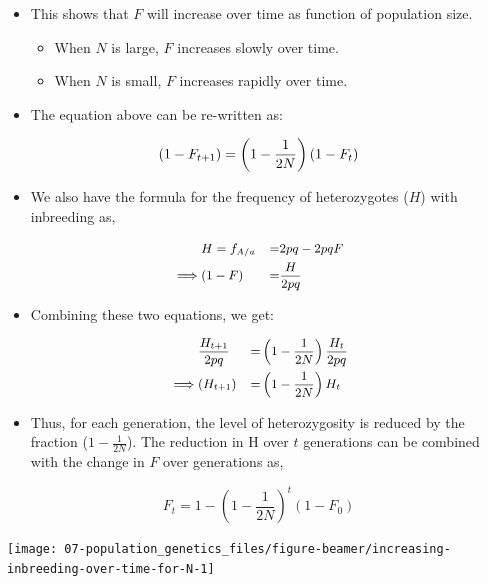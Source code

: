 \documentclass[11pt,dvipsnames,ignorenonframetext,aspectratio=169]{beamer}
\providecommand{\tightlist}{%
  \setlength{\itemsep}{0pt}\setlength{\parskip}{0pt}}
\begin{document}
\begin{frame}{}
\protect\hypertarget{section-8}{}
\footnotesize

\begin{itemize}
\tightlist
\item
  This shows that \(F\) will increase over time as function of
  population size.

  \begin{itemize}
  \tightlist
  \item
    When \(N\) is large, \(F\) increases slowly over time.
  \item
    When \(N\) is small, \(F\) increases rapidly over time.
  \end{itemize}
\item
  The equation above can be re-written as:
\end{itemize}

\[
\small
(1 - F_{t+1}) = \left(1 - \frac{1}{2N} \right) (1 - F_t)
\]
\end{frame}

\begin{frame}{}
\protect\hypertarget{section-9}{}
\begin{itemize}
\tightlist
\item
  We also have the formula for the frequency of heterozygotes (\(H\))
  with inbreeding as,
\end{itemize}

\[
\small
\begin{aligned}
& H = f_{A/a} &=& 2pq - 2pqF \\
\implies & (1-F) &=& \frac{H}{2pq}
\end{aligned}
\]

\begin{itemize}
\tightlist
\item
  Combining these two equations, we get:
\end{itemize}

\[
\small
\begin{aligned}
& \frac{H_{t+1}}{2pq}  &=& \left( 1- \frac{1}{2N} \right) \frac{H_t}{2pq}\\
\implies &(H_{t+1}) &=& \left(1 - \frac{1}{2N} \right) H_t
\end{aligned}
\]
\end{frame}

\begin{frame}{}
\protect\hypertarget{section-10}{}
\footnotesize

\begin{itemize}
\tightlist
\item
  Thus, for each generation, the level of heterozygosity is reduced by
  the fraction (\(1 - \frac{1}{2N}\)). The reduction in H over \(t\)
  generations can be combined with the change in \(F\) over generations
  as,
\end{itemize}

\[
F_t = 1 - \left(1 - \frac{1}{2N} \right)^t (1 - F_0)
\]

\begin{center}\texttt{[image: 07-population\_genetics\_files/figure-beamer/increasing-inbreeding-over-time-for-N-1]} \end{center}
\end{frame}
\end{document}
